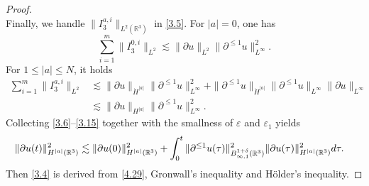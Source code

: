 \documentclass[10pt,a4paper]{amsart}
\def\R{\mathop{\mathbb R\kern 0pt}\nolimits}
\def\ls{\lesssim}
\def\p{\partial}
\def\ve{\varepsilon}
\begin{document}
\begin{proof}
\begin{equation*}
\end{equation*}
Finally, we handle $\|I_3^{a,i}\|_{L^2(\mathbb{R}^3)}$ in \eqref{3.5}. For $|a|= 0$, one has
\begin{equation*}
\sum_{i=1}^{m}\|I_3^{0,i}\|_{L^2}\ls \|\p u\|_{L^2}\|\p^{\le 1} u\|_{L^\infty}^2.
\end{equation*}
For $1\le|a|\le N$, it holds
\begin{equation}\label{3.15}
\begin{split}
\sum_{i=1}^{m}\|I_3^{a,i}\|_{L^2}
&\ls \|\partial u\|_{\dot{H}^{|a|}} \|\partial^{\le1} u\|_{L^\infty}^2 + \|\partial^{\le 1} u\|_{\dot{H}^{|a|}} \|\partial^{\le1} u\|_{L^\infty}\|\partial u\|_{L^\infty}\\
&\ls 	\|\partial u\|_{{H}^{|a|}} \|\partial^{\le 1}  u\|_{L^\infty}^2.
\end{split}	
\end{equation}
Collecting \eqref{3.6}--\eqref{3.15} together with the smallness of  $\ve$ and $\ve_1$ yields
\begin{equation}\label{4.29}
\begin{aligned}
\|\partial  u(t)\|_{H^{|a|}(\mathbb{R}^3)}^2 &\lesssim \|\partial  u(0)\|_{H^{|a|}(\mathbb{R}^3)}^2
+\int_0^t   \|\partial^{\le1} u(\tau)\|_{B^{1+\delta}_{\infty,1}(\R^3)}^2   \|\partial  u(\tau )\|_{H^{|a|}(\mathbb{R}^3)}^2 d\tau.
\end{aligned}
\end{equation}
Then \eqref{3.4} is derived  from \eqref{4.29}, Gronwall's inequality and H\"older's inequality.
\end{proof}
\end{document}
